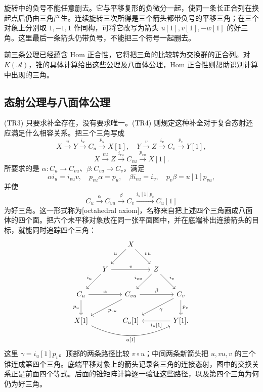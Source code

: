 旋转中的负号不能任意删去。它与平移复形的负微分一起，使同一条长正合列在换起点后仍由三角产生。连续旋转三次所得是三个箭头都带负号的平移三角；在三个对象上分别取 \(1,-1,1\) 作同构，可将它改写为箭头 \(u[1],v[1],-w[1]\) 的好三角。这里最后一条箭头仍带负号，不能把三个符号一起删去。

\ProseParagraphBreak
前三条公理已经蕴含 Hom 正合性，它将把三角的比较转为交换群的正合列。对 \(K(\mathcal A)\)，锥的具体计算给出这些公理及八面体公理，Hom 正合性则帮助识别计算中出现的三角。

\subsection{态射公理与八面体公理}
\label{b4:subsec:1602:02}

(TR3) 只要求补全存在，没有要求唯一。(TR4) 则规定这种补全对于复合态射还应满足什么相容关系。把三个三角写成
\[
	X\xrightarrow{u}Y\xrightarrow{i_u}C_u\xrightarrow{p_u}X[1],\quad Y\xrightarrow{v}Z\xrightarrow{i_v}C_v\xrightarrow{p_v}Y[1],
\]
\[
	X\xrightarrow{vu}Z\xrightarrow{i_{vu}}C_{vu}\xrightarrow{p_{vu}}X[1].
\]
所要求的是 \(\alpha:C_u\to C_{vu}\)、\(\beta:C_{vu}\to C_v\)，满足
\[
	\alpha i_u=i_{vu}v,\quad p_{vu}\alpha=p_u,\quad \beta i_{vu}=i_v,\quad p_v\beta=u[1]p_{vu},
\]
并使
\[
	C_u\xrightarrow{\alpha}C_{vu}\xrightarrow{\beta}C_v \xrightarrow{i_u[1]p_v}C_u[1]
\]
为好三角。这一形式称为[octahedral axiom]，名称来自把上述四个三角画成八面体的四个面。把六个未平移对象放在同一张平面图中，并在底端补出连接箭头的目标，就能同时追踪四个三角：
\[
	\begin{tikzcd}[column sep=1.2em,row sep=2.1em]
		&&X\arrow[dl,"u"']\arrow[dr,"vu"]&&\\
		&Y\arrow[rr,"v"]\arrow[dl,"i_u"']&&Z\arrow[dl,"i_{vu}"']\arrow[dr,"i_v"]&\\
		C_u\arrow[rr,"\alpha"]\arrow[d,"p_u"']&&C_{vu}\arrow[rr,"\beta"]\arrow[dll,"p_{vu}"]&&C_v\arrow[d,"p_v"]\arrow[dll,"\gamma"]\\
		X[1]\arrow[rrrr,bend right=25,"{u[1]}"']&&C_u[1]&&Y[1]\arrow[ll,"{i_u[1]}"] .
	\end{tikzcd}
\]
这里 \(\gamma=i_u[1]p_v\)。顶部的两条路径比较 \(v\circ u\)；中间两条新箭头把 \(u,vu,v\) 的三个锥连成第四个三角。底端平移对象上的箭头记录各三角的连接态射，图中的交换关系正是前面四个等式。后面的锥矩阵计算逐一验证这些路径，以及第四个三角为何仍为好三角。

